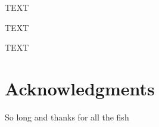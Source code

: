 \documentclass[fleqn,11pt]{SelfArx} %
\begin{document}
TEXT



\newpage

TEXT 


\newpage

TEXT

\section*{Acknowledgments} %


So long and thanks for all the fish %

\nocite{*}



\end{document}
